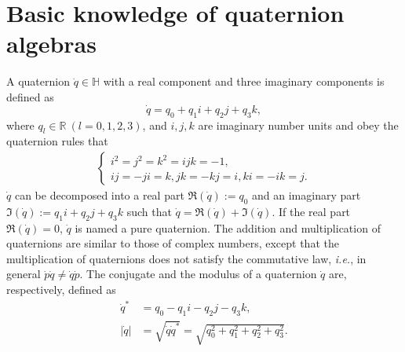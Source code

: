 \documentclass[journal]{IEEEtran}
\begin{document}
\appendices
\section{Basic knowledge of quaternion algebras}
\label{a_sec1}
A quaternion $\dot{q}\in\mathbb{H}$ with a real component and three imaginary components is defined as
\begin{equation}
	\label{equ2}
	\dot{q}=q_{0}+q_{1}i+q_{2}j+q_{3}k,
\end{equation}
where $q_{l}\in\mathbb{R}\: (l=0,1,2,3)$, and $i, j, k$ are
imaginary number units and obey the quaternion rules that
\begin{align}
	\left\{
	\begin{array}{lc}
		i^{2}=j^{2}=k^{2}=ijk=-1,\\
		ij=-ji=k, jk=-kj=i, ki=-ik=j.
	\end{array}
	\right.
\end{align}
$\dot{q}$ can be decomposed into a real part $\mathfrak{R}(\dot{q}):=q_{0}$ and an imaginary part $\mathfrak{I}(\dot{q}):=q_{1}i+q_{2}j+q_{3}k$ such that $\dot{q}=\mathfrak{R}(\dot{q})+\mathfrak{I}(\dot{q})$.
If the real part $\mathfrak{R}(\dot{q})=0$, $\dot{q}$ is named a pure quaternion. The addition and multiplication of quaternions are similar to those of complex numbers, except that the multiplication of quaternions does not satisfy the commutative law, \emph{i.e.}, in general $\dot{p}\dot{q}\neq\dot{q}\dot{p}$.
The conjugate and the modulus of a quaternion $\dot{q}$ are,
respectively, defined as 
\begin{align*}
	\dot{q}^{\ast}&=q_{0}-q_{1}i-q_{2}j-q_{3}k,\\
	|\dot{q}|&=\sqrt{\dot{q}\dot{q}^{\ast}}=\sqrt{q_{0}^{2}+q_{1}^{2}+q_{2}^{2}+q_{3}^{2}}.
\end{align*}
\end{document}
